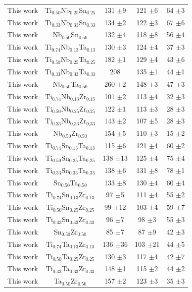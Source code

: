 \begin{longtable}[H]{ c c c c c}
	This work & Ti$_{0.50}$Nb$_{0.25}$Sn$_{0.25}$ & 131 $\pm$9 & 121 $\pm$6 & 64 $\pm$3 \\
	This work & Ti$_{0.33}$Nb$_{0.33}$Sn$_{0.33}$ & 134 $\pm$2 & 122 $\pm$3 & 67 $\pm$6 \\
	This work & Nb$_{0.50}$Sn$_{0.50}$ & 132 $\pm$4 & 118 $\pm$8 & 56 $\pm$4 \\
	This work & Ti$_{0.74}$Nb$_{0.13}$Ta$_{0.13}$ & 130 $\pm$3 & 124 $\pm$4 & 37 $\pm$3 \\
	This work & Ti$_{0.50}$Nb$_{0.25}$Ta$_{0.25}$ & 182 $\pm$1 & 129 $\pm$4 & 43 $\pm$6 \\
	This work & Ti$_{0.33}$Nb$_{0.33}$Ta$_{0.33}$ & 208 & 135 $\pm$1 & 44 $\pm$1 \\
	This work & Nb$_{0.50}$Ta$_{0.50}$ & 260 $\pm$2 & 148 $\pm$3 & 47 $\pm$3 \\
	This work & Ti$_{0.74}$Nb$_{0.13}$Zr$_{0.13}$ & 101 $\pm$2 & 113 $\pm$4 & 32 $\pm$3\\
	This work & Ti$_{0.50}$Nb$_{0.25}$Zr$_{0.25}$ & 122 $\pm$1 & 113 $\pm$3 & 28 $\pm$3 \\
	This work & Ti$_{0.33}$Nb$_{0.33}$Zr$_{0.33}$ & 143 $\pm$2 & 107 $\pm$5 & 28 $\pm$3 \\
	This work & Nb$_{0.50}$Zr$_{0.50}$ & 154 $\pm$5 & 110 $\pm$3 & 15 $\pm$2 \\
	This work & Ti$_{0.74}$Sn$_{0.13}$Ta$_{0.13}$ & 115 $\pm$6 & 121 $\pm$4 & 60 $\pm$2 \\
	This work & Ti$_{0.50}$Sn$_{0.25}$Ta$_{0.25}$ & 138 $\pm$13 & 125 $\pm$4 & 75 $\pm$4 \\
	This work & Ti$_{0.33}$Sn$_{0.33}$Ta$_{0.33}$ & 138 $\pm$6 & 131 $\pm$8 & 78 $\pm$1 \\
	This work & Sn$_{0.50}$Ta$_{0.50}$ & 133 $\pm$8 & 130 $\pm$4 & 60 $\pm$4 \\
	This work & Ti$_{0.74}$Sn$_{0.13}$Zr$_{0.13}$ & 97 $\pm$5 & 111 $\pm$4 & 55 $\pm$2 \\
	This work & Ti$_{0.50}$Sn$_{0.25}$Zr$_{0.25}$ & 99 $\pm$12 & 103 $\pm$4 & 59 $\pm$7 \\
	This work & Ti$_{0.33}$Sn$_{0.33}$Zr$_{0.33}$ & 96 $\pm$7 & 98 $\pm$3 & 55 $\pm$3 \\
	This work & Sn$_{0.50}$Zr$_{0.50}$ & 85 $\pm$7 & 87 $\pm$9 & 42 $\pm$3 \\
	This work & Ti$_{0.74}$Ta$_{0.13}$Zr$_{0.13}$ & 136 $\pm$36 & 103 $\pm$21 & 44 $\pm$5 \\
	This work & Ti$_{0.50}$Ta$_{0.25}$Zr$_{0.25}$ & 130 $\pm$3 & 117 $\pm$4 & 42 $\pm$7 \\
	This work & Ti$_{0.33}$Ta$_{0.33}$Zr$_{0.33}$ & 148 $\pm$1 & 115 $\pm$2 & 44 $\pm$2 \\
	This work & Ta$_{0.50}$Zr$_{0.50}$ & 157 $\pm$2 & 123 $\pm$3 & 35 $\pm$3 \\
	\hline
\end{longtable}

